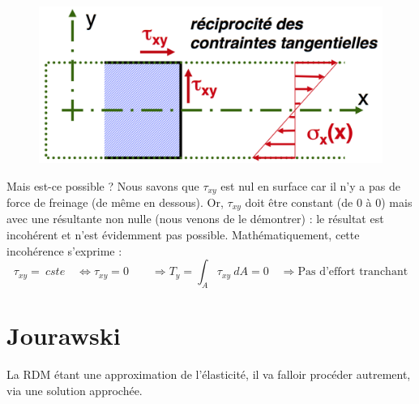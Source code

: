 		\begin{figure}
		\vspace{-10mm}
		\includegraphics[scale=0.25]{ch5/image6}
		\end{figure}
		Mais est-ce possible ? Nous savons que $\tau_{xy}$ est nul en surface 
		car il n'y a pas de force de freinage (de même en dessous). Or, 
		$\tau_{xy}$ doit être constant (de 0 à 0) mais avec une résultante 
		non nulle (nous venons de le démontrer) : le résultat est incohérent 
		et n'est évidemment pas possible.  Mathématiquement, cette incohérence 
		s'exprime :
		\begin{equation}
		\tau_{xy} =\ cste\quad \Leftrightarrow \tau_{xy}=0\qquad \Longrightarrow 
		T_y = \int_A \tau_{xy}\ dA = 0\quad \Longrightarrow \text{Pas d'effort 
		tranchant}
		\end{equation}


\section{Jourawski}
La RDM étant une approximation de l'élasticité, il va falloir procéder 
autrement, via une solution approchée.	
	
